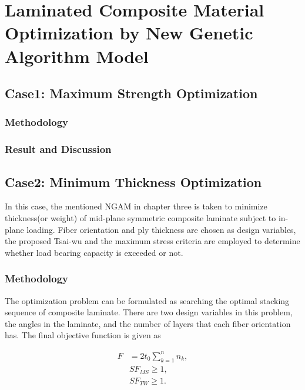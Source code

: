 
\chapter{Laminated Composite Material Optimization by New Genetic Algorithm Model} %

\label{Chapter4} %


\section{Case1: Maximum Strength Optimization}


\subsection{Methodology}

\subsection{Result and Discussion}

\section{Case2: Minimum Thickness Optimization}
In this case, the mentioned NGAM in chapter three is taken to minimize thickness(or
weight) of mid-plane symmetric composite laminate subject to in-plane loading.
Fiber orientation and ply thickness are chosen as design variables, the proposed
Tsai-wu and the maximum stress criteria are employed to determine whether
load bearing capacity is exceeded or not.

\subsection{Methodology}

The optimization problem can be formulated as searching the optimal stacking
sequence of composite laminate. There are two design variables in this problem,
the angles in the laminate, and the number of layers that each fiber orientation
has. The final objective function is given as

\begin{equation}
	\begin{split}
    	F  &= 2t_0 \sum_{k=1}^n n_k  \textstyle{,}\\
    	   &SF_{MS} \geq 1 \textstyle{,} \\
    	   &SF_{TW} \geq 1 \textstyle{.}
	\end{split} 
\end{equation}

